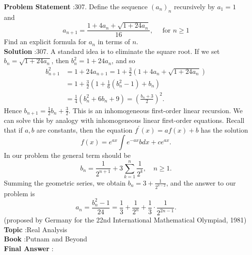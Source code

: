 \documentclass[10pt]{article}
\begin{document}
\textbf{Problem Statement} :307. Define the sequence $\left(a_{n}\right)_{n}$ recursively by $a_{1}=1$ and$$ a_{n+1}=\frac{1+4 a_{n}+\sqrt{1+24 a_{n}}}{16}, \quad \text { for } n \geq 1 $$Find an explicit formula for $a_{n}$ in terms of $n$. \\
\textbf{Solution} :307. A standard idea is to eliminate the square root. If we set $b_{n}=\sqrt{1+24 a_{n}}$, then $b_{n}^{2}=1+24 a_{n}$, and so$$ \begin{aligned} b_{n+1}^{2} &=1+24 a_{n+1}=1+\frac{3}{2}\left(1+4 a_{n}+\sqrt{1+24 a_{n}}\right) \\ &=1+\frac{3}{2}\left(1+\frac{1}{6}\left(b_{n}^{2}-1\right)+b_{n}\right) \\ &=\frac{1}{4}\left(b_{n}^{2}+6 b_{n}+9\right)=\left(\frac{b_{n}+3}{2}\right)^{2} . \end{aligned} $$Hence $b_{n+1}=\frac{1}{2} b_{n}+\frac{3}{2}$. This is an inhomogeneous first-order linear recursion. We can solve this by analogy with inhomogeneous linear first-order equations. Recall that if $a, b$ are constants, then the equation $f^{\prime}(x)=a f(x)+b$ has the solution$$ f(x)=e^{a x} \int e^{-a x} b d x+c e^{a x} . $$In our problem the general term should be$$ b_{n}=\frac{1}{2^{n+1}}+3 \sum_{k=1}^{n} \frac{1}{2^{k}}, \quad n \geq 1 . $$Summing the geometric series, we obtain $b_{n}=3+\frac{1}{2^{n-2}}$, and the answer to our problem is$$ a_{n}=\frac{b_{n}^{2}-1}{24}=\frac{1}{3}+\frac{1}{2^{n}}+\frac{1}{3} \cdot \frac{1}{2^{2 n-1}} . $$(proposed by Germany for the 22nd International Mathematical Olympiad, 1981)\\
\textbf{Topic} :Real Analysis\\
\textbf{Book} :Putnam and Beyond\\
\textbf{Final Answer} :\\
\end{document}
